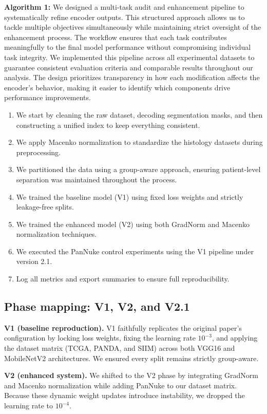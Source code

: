 \documentclass[conference,a4paper]{IEEEtran}
\begin{document}
\textbf{Algorithm 1:} We designed a multi-task audit and enhancement pipeline to systematically refine encoder outputs. This structured approach allows us to tackle multiple objectives simultaneously while maintaining strict oversight of the enhancement process. The workflow ensures that each task contributes meaningfully to the final model performance without compromising individual task integrity. We implemented this pipeline across all experimental datasets to guarantee consistent evaluation criteria and comparable results throughout our analysis. The design prioritizes transparency in how each modification affects the encoder's behavior, making it easier to identify which components drive performance improvements.
\begin{enumerate}
\item We start by cleaning the raw dataset, decoding segmentation masks, and then constructing a unified index to keep everything consistent.
\item We apply Macenko normalization to standardize the histology datasets during preprocessing.
\item We partitioned the data using a group-aware approach, ensuring patient-level separation was maintained throughout the process.
\item We trained the baseline model (V1) using fixed loss weights and strictly leakage-free splits.
\item We trained the enhanced model (V2) using both GradNorm and Macenko normalization techniques.
\item We executed the PanNuke control experiments using the V1 pipeline under version 2.1.
\item Log all metrics and export summaries to ensure full reproducibility.
\end{enumerate}
\subsection{Phase mapping: V1, V2, and V2.1}
\textbf{V1 (baseline reproduction).} V1 faithfully replicates the original paper’s configuration by locking loss weights, fixing the learning rate $10^{-3}$, and applying the dataset matrix (TCGA, PANDA, and SIIM) across both VGG16 and MobileNetV2 architectures. We ensured every split remains strictly group-aware.

\textbf{V2 (enhanced system).} We shifted to the V2 phase by integrating GradNorm and Macenko normalization while adding PanNuke to our dataset matrix. Because these dynamic weight updates introduce instability, we dropped the learning rate to $10^{-4}$.
\end{document}
